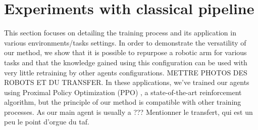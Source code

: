 \documentclass[letterpaper, 10 pt, conference]{ieeeconf}  %
\begin{document}







\section{Experiments with classical pipeline} %
\label{sec:experiments}

This section focuses on detailing the training process and its application in various environments/tasks settings. In order to demonstrate the versatility of our method, we show that it is possible to repurpose a robotic arm for various tasks and that the knowledge gained using this configuration can be used with very little retraining by other agents configurations. \uppercase{Mettre photos des robots et du transfer}. In these applications, we've trained our agents using Proximal Policy Optimization (PPO) \cite{PPO}, a state-of-the-art reinforcement algorithm, but the principle of our method is compatible with other training processes. As our main agent is usually a ??? 
Mentionner le transfert, qui est un peu le point d'orgue du taf. 


\end{document}
